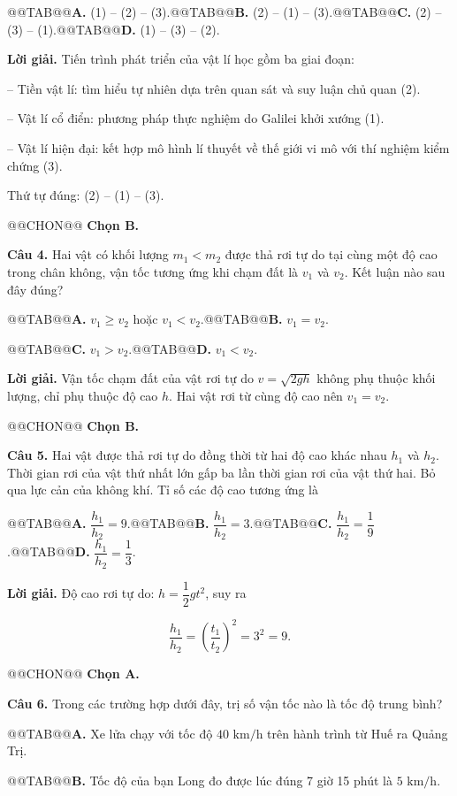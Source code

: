 \documentclass{article}
\begin{document}
@@TAB@@\textbf{A.} (1) -- (2) -- (3).@@TAB@@\textbf{B.} (2) -- (1) -- (3).@@TAB@@\textbf{C.} (2) -- (3) -- (1).@@TAB@@\textbf{D.} (1) -- (3) -- (2).

\textbf{Lời giải.} Tiến trình phát triển của vật lí học gồm ba giai đoạn:

-- Tiền vật lí: tìm hiểu tự nhiên dựa trên quan sát và suy luận chủ quan (2).

-- Vật lí cổ điển: phương pháp thực nghiệm do Galilei khởi xướng (1).

-- Vật lí hiện đại: kết hợp mô hình lí thuyết về thế giới vi mô với thí nghiệm kiểm chứng (3).

Thứ tự đúng: (2) -- (1) -- (3).

@@CHON@@ \textbf{Chọn B.}

\textbf{Câu 4.} Hai vật có khối lượng $m_1 < m_2$ được thả rơi tự do tại cùng một độ cao trong chân không, vận tốc tương ứng khi chạm đất là $v_1$ và $v_2$. Kết luận nào sau đây đúng?

@@TAB@@\textbf{A.} $v_1 \ge v_2$ hoặc $v_1 < v_2$.@@TAB@@\textbf{B.} $v_1 = v_2$.

@@TAB@@\textbf{C.} $v_1 > v_2$.@@TAB@@\textbf{D.} $v_1 < v_2$.

\textbf{Lời giải.} Vận tốc chạm đất của vật rơi tự do $v = \sqrt{2gh}$ không phụ thuộc khối lượng, chỉ phụ thuộc độ cao $h$. Hai vật rơi từ cùng độ cao nên $v_1 = v_2$.

@@CHON@@ \textbf{Chọn B.}

\textbf{Câu 5.} Hai vật được thả rơi tự do đồng thời từ hai độ cao khác nhau $h_1$ và $h_2$. Thời gian rơi của vật thứ nhất lớn gấp ba lần thời gian rơi của vật thứ hai. Bỏ qua lực cản của không khí. Tỉ số các độ cao tương ứng là

@@TAB@@\textbf{A.} $\dfrac{h_1}{h_2} = 9$.@@TAB@@\textbf{B.} $\dfrac{h_1}{h_2} = 3$.@@TAB@@\textbf{C.} $\dfrac{h_1}{h_2} = \dfrac{1}{9}$.@@TAB@@\textbf{D.} $\dfrac{h_1}{h_2} = \dfrac{1}{3}$.

\textbf{Lời giải.} Độ cao rơi tự do: $h = \dfrac{1}{2}gt^2$, suy ra

\[\frac{h_1}{h_2} = \left(\frac{t_1}{t_2}\right)^2 = 3^2 = 9.\]

@@CHON@@ \textbf{Chọn A.}

\textbf{Câu 6.} Trong các trường hợp dưới đây, trị số vận tốc nào là tốc độ trung bình?

@@TAB@@\textbf{A.} Xe lửa chạy với tốc độ $40\text{ km/h}$ trên hành trình từ Huế ra Quảng Trị.

@@TAB@@\textbf{B.} Tốc độ của bạn Long đo được lúc đúng 7 giờ 15 phút là $5\text{ km/h}$.
\end{document}
